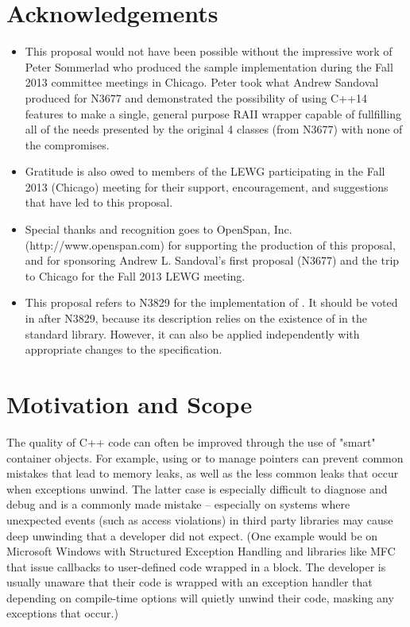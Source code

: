 \documentclass[ebook,11pt,article]{memoir}
\begin{document}
\chapter{Acknowledgements}
\begin{itemize}
\item This proposal would not have been possible without the impressive work of Peter Sommerlad who produced the sample implementation during the Fall 2013 committee meetings in Chicago.  Peter took what Andrew Sandoval produced for N3677 and demonstrated the possibility of using C++14 features to make a single, general purpose RAII wrapper capable of fullfilling all of the needs presented by the original 4 classes (from N3677) with none of the compromises.
\item Gratitude is also owed to members of the LEWG participating in the Fall 2013 (Chicago) meeting for their support, encouragement, and suggestions that have led to this proposal.
\item Special thanks and recognition goes to OpenSpan, Inc. (http://www.openspan.com) for supporting the production of this proposal, and for sponsoring Andrew L. Sandoval's first proposal (N3677) and the trip to Chicago for the Fall 2013 LEWG meeting.
\item This proposal refers to N3829 for the implementation of . It should be voted in after N3829, because its description relies on the existence of  in the standard library. However, it can also be applied independently with appropriate changes to the specification.
\end{itemize}

\chapter{Motivation and Scope}
The quality of C++ code can often be improved through the use of "smart" container objects.  For example, using  or  to manage pointers can prevent common mistakes that lead to memory leaks, as well as the less common leaks that occur when exceptions unwind.  The latter case is especially difficult to diagnose and debug and is a commonly made mistake -- especially on systems where unexpected events (such as access violations) in third party libraries may cause deep unwinding that a developer did not expect.  (One example would be on Microsoft Windows with Structured Exception Handling and libraries like MFC that issue callbacks to user-defined code wrapped in a  block.  The developer is usually unaware that their code is wrapped with an exception handler that depending on compile-time options will quietly unwind their code, masking any exceptions that occur.)
\end{document}
